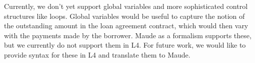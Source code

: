 \documentclass{article}
\begin{document}
Currently, we don't yet support global variables and more sophisticated control
structures like loops.
Global variables would be useful to capture the notion of the outstanding amount
in the loan agreement contract, which would then vary with the payments made by
the borrower.
Maude as a formalism supports these, but we currently do not support them in L4.
For future work, we would like to provide syntax for these in L4 and translate
them to Maude.

\newpage



\end{document}
